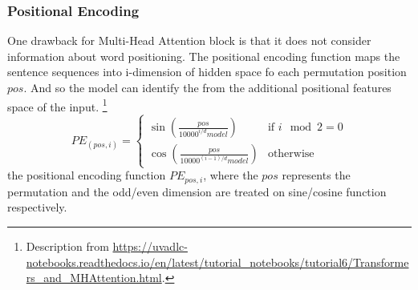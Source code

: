 %
%
\subsubsection{Positional Encoding}
One drawback for Multi-Head Attention block is that it does not consider information about word positioning. The positional encoding function maps the sentence sequences into i-dimension of hidden space fo each permutation position $ pos $. And so the model can identify the from the additional positional features space of the input.
\footnote{Description from \url{https://uvadlc-notebooks.readthedocs.io/en/latest/tutorial_notebooks/tutorial6/Transformers_and_MHAttention.html}.}
\[ PE_{(pos,i)} = \begin{cases} 
\sin\left(\frac{pos}{10000^{i/d}model}\right) & \text{if }i \mod 2 = 0 \\
\cos\left(\frac{pos}{10000^{(i-1)/d}model}\right) & \text{otherwise}
       \end{cases}
    \]
the positional encoding function $ PE_{pos,i} $, where the $ pos $ represents the permutation 
and the odd/even dimension are treated on sine/cosine function respectively. 

